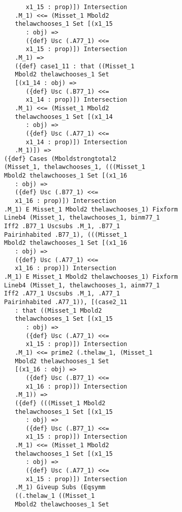 \documentclass[12pt]{article}
\begin{document}
\begin{verbatim}
                   x1_15 : prop)]) Intersection 
                .M_1) <<= (Misset_1 Mbold2 
                thelawchooses_1 Set [(x1_15 
                   : obj) => 
                   ({def} Usc (.A77_1) <<= 
                   x1_15 : prop)]) Intersection 
                .M_1) => 
                ({def} case1_11 : that ((Misset_1 
                Mbold2 thelawchooses_1 Set 
                [(x1_14 : obj) => 
                   ({def} Usc (.B77_1) <<= 
                   x1_14 : prop)]) Intersection 
                .M_1) <<= (Misset_1 Mbold2 
                thelawchooses_1 Set [(x1_14 
                   : obj) => 
                   ({def} Usc (.A77_1) <<= 
                   x1_14 : prop)]) Intersection 
                .M_1)]) => 
             ({def} Cases (Mboldstrongtotal2 
             (Misset_1, thelawchooses_1, (((Misset_1 
             Mbold2 thelawchooses_1 Set [(x1_16 
                : obj) => 
                ({def} Usc (.B77_1) <<= 
                x1_16 : prop)]) Intersection 
             .M_1) E Misset_1 Mbold2 thelawchooses_1) Fixform 
             Lineb4 (Misset_1, thelawchooses_1, binm77_1 
             Iff2 .B77_1 Uscsubs .M_1, .B77_1 
             Pairinhabited .B77_1), (((Misset_1 
             Mbold2 thelawchooses_1 Set [(x1_16 
                : obj) => 
                ({def} Usc (.A77_1) <<= 
                x1_16 : prop)]) Intersection 
             .M_1) E Misset_1 Mbold2 thelawchooses_1) Fixform 
             Lineb4 (Misset_1, thelawchooses_1, ainm77_1 
             Iff2 .A77_1 Uscsubs .M_1, .A77_1 
             Pairinhabited .A77_1)), [(case2_11 
                : that ((Misset_1 Mbold2 
                thelawchooses_1 Set [(x1_15 
                   : obj) => 
                   ({def} Usc (.A77_1) <<= 
                   x1_15 : prop)]) Intersection 
                .M_1) <<= prime2 (.thelaw_1, (Misset_1 
                Mbold2 thelawchooses_1 Set 
                [(x1_16 : obj) => 
                   ({def} Usc (.B77_1) <<= 
                   x1_16 : prop)]) Intersection 
                .M_1)) => 
                ({def} (((Misset_1 Mbold2 
                thelawchooses_1 Set [(x1_15 
                   : obj) => 
                   ({def} Usc (.B77_1) <<= 
                   x1_15 : prop)]) Intersection 
                .M_1) <<= (Misset_1 Mbold2 
                thelawchooses_1 Set [(x1_15 
                   : obj) => 
                   ({def} Usc (.A77_1) <<= 
                   x1_15 : prop)]) Intersection 
                .M_1) Giveup Subs (Eqsymm 
                ((.thelaw_1 ((Misset_1 
                Mbold2 thelawchooses_1 Set 

\end{verbatim}
\end{document}
